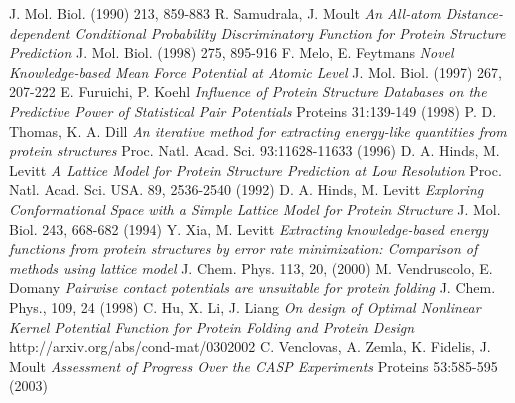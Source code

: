 \documentclass[a4paper,20pt,notitlepage,openbib]{article}
\begin{document}
\begin{thebibliography}{99}
J. Mol. Biol. (1990) 213, 859-883
R. Samudrala, J. Moult
\emph{An All-atom Distance-dependent Conditional Probability Discriminatory Function for Protein Structure Prediction}
J. Mol. Biol. (1998) 275, 895-916
F. Melo, E. Feytmans
\emph{Novel Knowledge-based Mean Force Potential at Atomic Level}
J. Mol. Biol. (1997) 267, 207-222
E. Furuichi, P. Koehl
\emph{Influence of Protein Structure Databases on the Predictive Power of Statistical Pair Potentials}
Proteins 31:139-149 (1998)
P. D. Thomas, K. A. Dill
\emph{An iterative method for extracting energy-like quantities from protein structures}
Proc. Natl. Acad. Sci. 93:11628-11633 (1996)
D. A. Hinds, M. Levitt
\emph{A Lattice Model for Protein Structure Prediction at Low Resolution}
Proc. Natl. Acad. Sci. USA. 89, 2536-2540 (1992)
D. A. Hinds, M. Levitt
\emph{Exploring Conformational Space with a Simple Lattice Model for Protein Structure}
J. Mol. Biol. 243,  668-682 (1994)
Y. Xia, M. Levitt
\emph{Extracting knowledge-based energy functions from protein structures by error rate minimization: Comparison of methods using lattice model}
J. Chem. Phys. 113, 20, (2000)
M. Vendruscolo, E. Domany
\emph{Pairwise contact potentials are unsuitable for protein folding}
J. Chem. Phys., 109, 24 (1998)
C. Hu, X. Li, J. Liang
\emph{On design of Optimal Nonlinear Kernel Potential Function for Protein Folding and Protein Design}
http://arxiv.org/abs/cond-mat/0302002
C. Venclovas, A. Zemla, K. Fidelis, J. Moult
\emph{Assessment of Progress Over the CASP Experiments}
Proteins 53:585-595 (2003)

\end{thebibliography}
\end{document}
